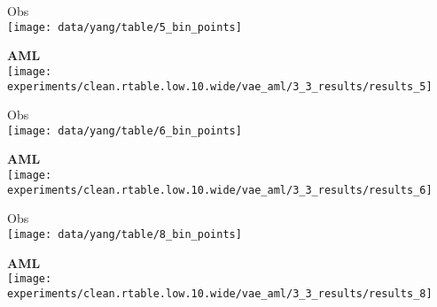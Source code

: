 {\footnotesize
\begin{minipage}[t]{0.03\textwidth}
    \vspace{0px}\centering
    \vspace{4mm}
\end{minipage}
\begin{minipage}[t]{0.145\textwidth}
    \vspace{0px}\centering
    \hspace*{2mm}
    Obs\\[-1px]
    \texttt{[image: data/yang/table/5\_bin\_points]}
\end{minipage}
\begin{minipage}[t]{0.145\textwidth}
    \vspace{0px}\centering
    \hspace*{2mm}
    {\bf\color{MPIIorange} AML}\\[-1px]
    \texttt{[image: experiments/clean.rtable.low.10.wide/vae\_aml/3\_3\_results/results\_5]}
\end{minipage}
\begin{minipage}[t]{0.145\textwidth}
    \vspace{0px}\centering
    \hspace*{2mm}
    Obs\\[-1px]
    \texttt{[image: data/yang/table/6\_bin\_points]}
\end{minipage}
\begin{minipage}[t]{0.145\textwidth}
    \vspace{0px}\centering
    \hspace*{2mm}
    {\bf\color{MPIIorange} AML}\\[-1px]
    \texttt{[image: experiments/clean.rtable.low.10.wide/vae\_aml/3\_3\_results/results\_6]}
\end{minipage}
\begin{minipage}[t]{0.145\textwidth}
    \vspace{0px}\centering
    \hspace*{2mm}
    Obs\\[-1px]
    \texttt{[image: data/yang/table/8\_bin\_points]}
\end{minipage}
\begin{minipage}[t]{0.145\textwidth}
	\vspace{0px}\centering
    \hspace*{2mm}
    {\bf\color{MPIIorange} AML}\\[-1px]
	\texttt{[image: experiments/clean.rtable.low.10.wide/vae\_aml/3\_3\_results/results\_8]}
\end{minipage}
}